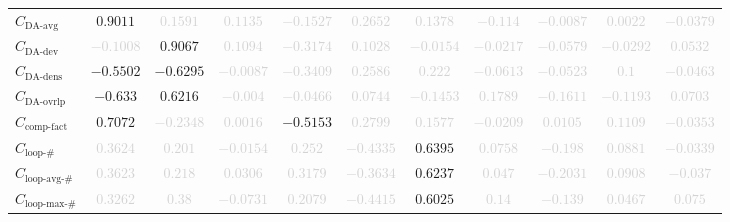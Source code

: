 \documentclass{standalone}
\newcommand{\daavgname}{\text{DA-avg}}
\newcommand{\daavg}{C_{\daavgname}}
\newcommand{\dadevname}{\text{DA-dev}}
\newcommand{\dadev}{C_{\dadevname}}
\newcommand{\dadensname}{\text{DA-dens}}
\newcommand{\dadens}{C_{\dadensname}}
\newcommand{\daoverlapname}{\text{DA-ovrlp}}
\newcommand{\daoverlap}{C_{\daoverlapname}}
\newcommand{\complexityfactorname}{\text{comp-fact}}
\newcommand{\complexityfactor}{C_{\complexityfactorname}}
\newcommand{\loopnumname}{\text{loop-\#}}
\newcommand{\loopnum}{C_{\loopnumname}}
\newcommand{\loopavgname}{\text{loop-avg-\#}}
\newcommand{\loopavg}{C_{\loopavgname}}
\newcommand{\loopmaxname}{\text{loop-max-\#}}
\newcommand{\loopmax}{C_{\loopmaxname}}
\begin{document}
\begin{tabular}{lcccccccccc}
$\daavg$ & $0.9011$ & \textcolor{lightgray}{$0.1591$} & \textcolor{lightgray}{$0.1135$} & \textcolor{lightgray}{$-0.1527$} & \textcolor{lightgray}{$0.2652$} & \textcolor{lightgray}{$0.1378$} & \textcolor{lightgray}{$-0.114$} & \textcolor{lightgray}{$-0.0087$} & \textcolor{lightgray}{$0.0022$} & \textcolor{lightgray}{$-0.0379$} \\ 
$\dadev$ & \textcolor{lightgray}{$-0.1008$} & $0.9067$ & \textcolor{lightgray}{$0.1094$} & \textcolor{lightgray}{$-0.3174$} & \textcolor{lightgray}{$0.1028$} & \textcolor{lightgray}{$-0.0154$} & \textcolor{lightgray}{$-0.0217$} & \textcolor{lightgray}{$-0.0579$} & \textcolor{lightgray}{$-0.0292$} & \textcolor{lightgray}{$0.0532$} \\ 
$\dadens$ & $-0.5502$ & $-0.6295$ & \textcolor{lightgray}{$-0.0087$} & \textcolor{lightgray}{$-0.3409$} & \textcolor{lightgray}{$0.2586$} & \textcolor{lightgray}{$0.222$} & \textcolor{lightgray}{$-0.0613$} & \textcolor{lightgray}{$-0.0523$} & \textcolor{lightgray}{$0.1$} & \textcolor{lightgray}{$-0.0463$} \\ 
$\daoverlap$ & $-0.633$ & $0.6216$ & \textcolor{lightgray}{$-0.004$} & \textcolor{lightgray}{$-0.0466$} & \textcolor{lightgray}{$0.0744$} & \textcolor{lightgray}{$-0.1453$} & \textcolor{lightgray}{$0.1789$} & \textcolor{lightgray}{$-0.1611$} & \textcolor{lightgray}{$-0.1193$} & \textcolor{lightgray}{$0.0703$} \\ 
$\complexityfactor$ & $0.7072$ & \textcolor{lightgray}{$-0.2348$} & \textcolor{lightgray}{$0.0016$} & $-0.5153$ & \textcolor{lightgray}{$0.2799$} & \textcolor{lightgray}{$0.1577$} & \textcolor{lightgray}{$-0.0209$} & \textcolor{lightgray}{$0.0105$} & \textcolor{lightgray}{$0.1109$} & \textcolor{lightgray}{$-0.0353$} \\ 
$\loopnum$ & \textcolor{lightgray}{$0.3624$} & \textcolor{lightgray}{$0.201$} & \textcolor{lightgray}{$-0.0154$} & \textcolor{lightgray}{$0.252$} & \textcolor{lightgray}{$-0.4335$} & $0.6395$ & \textcolor{lightgray}{$0.0758$} & \textcolor{lightgray}{$-0.198$} & \textcolor{lightgray}{$0.0881$} & \textcolor{lightgray}{$-0.0339$} \\ 
$\loopavg$ & \textcolor{lightgray}{$0.3623$} & \textcolor{lightgray}{$0.218$} & \textcolor{lightgray}{$0.0306$} & \textcolor{lightgray}{$0.3179$} & \textcolor{lightgray}{$-0.3634$} & $0.6237$ & \textcolor{lightgray}{$0.047$} & \textcolor{lightgray}{$-0.2031$} & \textcolor{lightgray}{$0.0908$} & \textcolor{lightgray}{$-0.037$} \\ 
$\loopmax$ & \textcolor{lightgray}{$0.3262$} & \textcolor{lightgray}{$0.38$} & \textcolor{lightgray}{$-0.0731$} & \textcolor{lightgray}{$0.2079$} & \textcolor{lightgray}{$-0.4415$} & $0.6025$ & \textcolor{lightgray}{$0.14$} & \textcolor{lightgray}{$-0.139$} & \textcolor{lightgray}{$0.0467$} & \textcolor{lightgray}{$0.075$} \\ 

\end{tabular}
\end{document}
